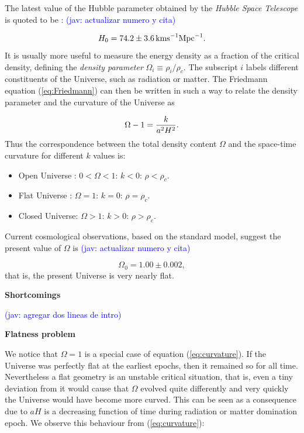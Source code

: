 \documentclass{rmaa}
\def\beq{\begin{equation}}
\def\eeq{\end{equation}}
\newcommand{\jav}[1]{\textcolor{blue}{(jav: #1)}}
\begin{document}
\noindent
The latest value of the Hubble parameter obtained by the \textit{Hubble Space Telescope}
is quoted to be \citep{Riess}: \jav{actualizar numero y cita}

\beq
 H_0= 74.2 \pm 3.6 \, {\rm km s}^{-1} {\rm Mpc}^{-1}. 
\eeq
%
It is usually more useful to measure the energy density as a fraction of the critical density,
defining the \textit{density parameter} $\Omega_i\equiv \rho_i / \rho_c$. The subscript $i$ labels
different constituents of the Universe, such as radiation or matter. 
The Friedmann equation (\ref{eq:Friedmann}) can then be written in such a way to
relate the density parameter and the curvature of the Universe as

\begin{equation} \label{eq:curvature}
 \Omega -1={k \over a^2H^2}.
\end{equation}
%
Thus the correspondence between the total density content $\Omega$ and the space-time 
curvature for different $k$ values is: 
\begin{itemize}
\item Open Universe : $0<\Omega<1: \, k<0: \, \rho<\rho_c$. 
\item Flat Universe       : $\Omega=1: \, k=0: \, \rho=\rho_c$. 
\item Closed Universe: $\Omega>1: \, k>0: \, \rho>\rho_c$.
\end{itemize}

   
\noindent
Current cosmological observations, based on the standard model, suggest the present value of 
$\Omega$ is \citep{Komat} \jav{actualizar numero y cita}

\beq \label{eq:Omega}
\Omega_0=1.00\pm 0.002,
\eeq
%
that is, the present Universe is very nearly flat.
\\


\begin{center}
\textbf{\large Shortcomings}
\end{center}
\jav{agregar dos lineas de intro}
\vskip 10pt

\textbf{Flatness problem}
\vskip 10pt


We notice that $\Omega=1$ is a special case of equation (\ref{eq:curvature}). 
If the Universe was 
perfectly flat at the earliest epochs,  then it remained so for all time. 
Nevertheless a flat geometry is an unstable
critical situation, that is, even a tiny deviation from it would cause that $\Omega$ evolved 
quite differently and very quickly the Universe would have become more curved. 
This can be seen as a consequence due to $aH$ is a decreasing function of time 
during radiation or matter domination epoch.
We observe this behaviour from (\ref{eq:curvature}):
%
\end{document}
